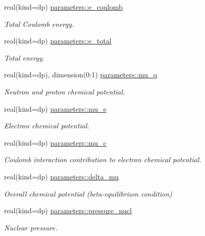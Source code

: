 \begin{DoxyCompactItemize}
real(kind=dp) \mbox{\hyperlink{group__WS__PROPERTIES_gaa693f79a53c67f65948484a0d2704154}{parameters\+::e\+\_\+coulomb}}
\begin{DoxyCompactList}\small\item\em Total Coulomb energy. \end{DoxyCompactList}\item 
real(kind=dp) \mbox{\hyperlink{group__WS__PROPERTIES_ga041ce78d1803675af0825ead4e0a512e}{parameters\+::e\+\_\+total}}
\begin{DoxyCompactList}\small\item\em Total energy. \end{DoxyCompactList}\item 
real(kind=dp), dimension(0\+:1) \mbox{\hyperlink{group__WS__PROPERTIES_ga640fd108640984ca51ba2f7cc29f2a8f}{parameters\+::mu\+\_\+q}}
\begin{DoxyCompactList}\small\item\em Neutron and proton chemical potential. \end{DoxyCompactList}\item 
real(kind=dp) \mbox{\hyperlink{group__WS__PROPERTIES_gacc0c124d82adcdfb692fb32f9e736bca}{parameters\+::mu\+\_\+e}}
\begin{DoxyCompactList}\small\item\em Electron chemical potential. \end{DoxyCompactList}\item 
real(kind=dp) \mbox{\hyperlink{group__WS__PROPERTIES_ga3025178429abf0548bda508408facd69}{parameters\+::mu\+\_\+c}}
\begin{DoxyCompactList}\small\item\em Coulomb interaction contribution to electron chemical potential. \end{DoxyCompactList}\item 
real(kind=dp) \mbox{\hyperlink{group__WS__PROPERTIES_ga44464a0deab6ab30fe9c2301379ceb71}{parameters\+::delta\+\_\+mu}}
\begin{DoxyCompactList}\small\item\em Overall chemical potential (beta-\/equilibrium condition) \end{DoxyCompactList}\item 
real(kind=dp) \mbox{\hyperlink{group__WS__PROPERTIES_ga769d654b2408c30dca03771d09945c2a}{parameters\+::pressure\+\_\+nucl}}
\begin{DoxyCompactList}\small\item\em Nuclear pressure. \end{DoxyCompactList}\item 

\end{DoxyCompactItemize}
